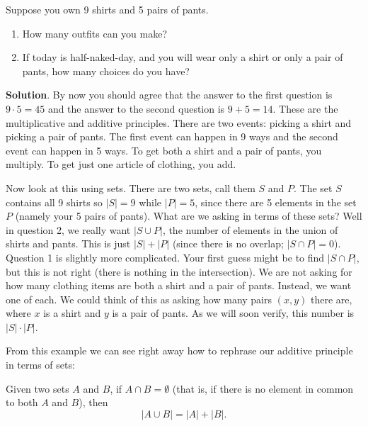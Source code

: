 \documentclass[11pt,]{book}
\theoremstyle{ptxplainnotitle}
\theoremstyle{ptxplaintitle}
\theoremstyle{ptxdefinitionnotitle}
\theoremstyle{ptxdefinitiontitle}
\theoremstyle{ptxdefinitionnotitle}
\theoremstyle{ptxdefinitiontitle}
\theoremstyle{ptxdefinitionnotitle}
\theoremstyle{ptxdefinitiontitle}
\theoremstyle{ptxdefinitiontitlenonumber}
\theoremstyle{ptxdefinitiontitlenonumber}
\numberwithin{equation}{chapter}
\newcommand{\card}[1]{\left| #1 \right|}
\begin{document}
\begin{example}\label{example-39}
\hypertarget{p-1059}{}%
Suppose you own 9 shirts and 5 pairs of pants.%
\par
\hypertarget{p-1060}{}%
\leavevmode%
\begin{enumerate}
\item\hypertarget{li-467}{}\hypertarget{p-1061}{}%
How many outfits can you make?%
\item\hypertarget{li-468}{}\hypertarget{p-1062}{}%
If today is half-naked-day, and you will wear only a shirt or only a pair of pants, how many choices do you have?%
\end{enumerate}
%
\par\smallskip%
\noindent\textbf{Solution}.\hypertarget{solution-148}{}\quad%
\hypertarget{p-1063}{}%
By now you should agree that the answer to the first question is \(9 \cdot 5 = 45\) and the answer to the second question is \(9 + 5 = 14\). These are the multiplicative and additive principles. There are two events: picking a shirt and picking a pair of pants. The first event can happen in 9 ways and the second event can happen in 5 ways. To get both a shirt and a pair of pants, you multiply. To get just one article of clothing, you add.%
\par
\hypertarget{p-1064}{}%
Now look at this using sets. There are two sets, call them \(S\) and \(P\). The set \(S\) contains all 9 shirts so \(|S| = 9\) while \(|P| = 5\), since there are 5 elements in the set \(P\) (namely your 5 pairs of pants). What are we asking in terms of these sets? Well in question 2, we really want \(|S \cup P|\), the number of elements in the union of shirts and pants. This is just \(|S| + |P|\) (since there is no overlap; \(|S \cap P| = 0\)). Question 1 is slightly more complicated. Your first guess might be to find \(|S \cap P|\), but this is not right (there is nothing in the intersection). We are not asking for how many clothing items are both a shirt and a pair of pants. Instead, we want one of each. We could think of this as asking how many pairs \((x,y)\) there are, where \(x\) is a shirt and \(y\) is a pair of pants. As we will soon verify, this number is \(|S| \cdot |P|\).%
\end{example}
\hypertarget{p-1065}{}%
From this example we can see right away how to rephrase our additive principle in terms of sets:%
\begin{assemblage}\label{assemblage-13}
\hypertarget{p-1066}{}%
 Given two sets \(A\) and \(B\), if \(A \cap B = \emptyset\) (that is, if there is no element in common to both \(A\) and \(B\)), then%
\begin{equation*}
\card{A \cup B} = \card{A} + \card{B}.
\end{equation*}
%
\end{assemblage}
\end{document}
